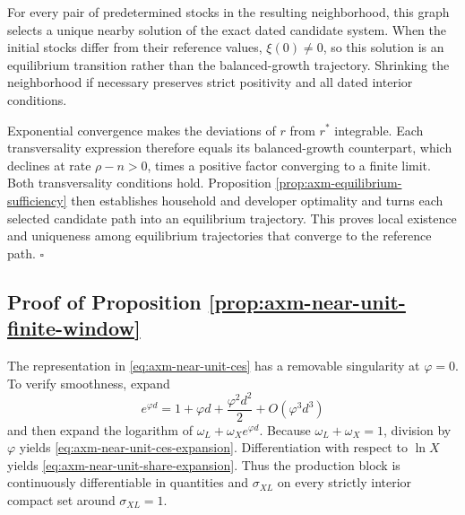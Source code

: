 For every pair of predetermined stocks in the resulting neighborhood, this
graph selects a unique nearby solution of the exact dated candidate system.
When the initial stocks differ from their reference values, \(\xi(0)\ne0\), so
this solution is an equilibrium transition rather than the balanced-growth
trajectory. Shrinking the neighborhood if necessary preserves strict
positivity and all dated interior conditions.

Exponential convergence makes the deviations of \(r\) from \(r^*\)
integrable. Each transversality expression therefore equals its
balanced-growth counterpart, which declines at rate \(\rho-n>0\), times a
positive factor converging to a finite limit. Both transversality conditions
hold. Proposition \ref{prop:axm-equilibrium-sufficiency} then establishes
household and developer optimality and turns each selected candidate path into
an equilibrium trajectory. This proves local existence and uniqueness among
equilibrium trajectories that converge to the reference path. \(\square\)

\subsection{Proof of Proposition \ref{prop:axm-near-unit-finite-window}}

The representation in \eqref{eq:axm-near-unit-ces} has a removable singularity
at \(\varphi=0\). To verify smoothness, expand
\[
 e^{\varphi d}=1+\varphi d+\frac{\varphi^2d^2}{2}
 +O(\varphi^3d^3)
\]
and then expand the logarithm of
\(\omega_L+\omega_Xe^{\varphi d}\). Because
\(\omega_L+\omega_X=1\), division by \(\varphi\) yields
\eqref{eq:axm-near-unit-ces-expansion}. Differentiation with respect to
\(\ln X\) yields \eqref{eq:axm-near-unit-share-expansion}. Thus the production
block is continuously differentiable in quantities and \(\sigma_{XL}\) on
every strictly interior compact set around \(\sigma_{XL}=1\).

